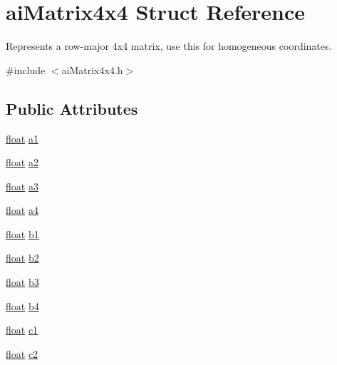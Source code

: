 \hypertarget{structai_matrix4x4}{\section{ai\-Matrix4x4 Struct Reference}
\label{structai_matrix4x4}
}


Represents a row-\/major 4x4 matrix, use this for homogeneous coordinates.  




{\ttfamily \#include $<$ai\-Matrix4x4.\-h$>$}

\subsection*{Public Attributes}
\begin{DoxyCompactItemize}
\item 
\hyperlink{fmod_8h_aeb841aa4b4b5f444b5d739d865b420af}{float} \hyperlink{structai_matrix4x4_aeabb269b7ef332d3c69c14d8af3d531c}{a1}
\item 
\hyperlink{fmod_8h_aeb841aa4b4b5f444b5d739d865b420af}{float} \hyperlink{structai_matrix4x4_a9d36d992ba3cfc814913e0225a04b91b}{a2}
\item 
\hyperlink{fmod_8h_aeb841aa4b4b5f444b5d739d865b420af}{float} \hyperlink{structai_matrix4x4_a36f0d69cf678c3b5deea5a76f5624848}{a3}
\item 
\hyperlink{fmod_8h_aeb841aa4b4b5f444b5d739d865b420af}{float} \hyperlink{structai_matrix4x4_a184e1a78f61c430aa7b0079b42e4c2a0}{a4}
\item 
\hyperlink{fmod_8h_aeb841aa4b4b5f444b5d739d865b420af}{float} \hyperlink{structai_matrix4x4_a59667637f4d71bf4ebc1183bebe746fb}{b1}
\item 
\hyperlink{fmod_8h_aeb841aa4b4b5f444b5d739d865b420af}{float} \hyperlink{structai_matrix4x4_af5dcecf706021b313239b7113cb80daa}{b2}
\item 
\hyperlink{fmod_8h_aeb841aa4b4b5f444b5d739d865b420af}{float} \hyperlink{structai_matrix4x4_a0f0bf4dfcf9dd562d71d5ed5a5342316}{b3}
\item 
\hyperlink{fmod_8h_aeb841aa4b4b5f444b5d739d865b420af}{float} \hyperlink{structai_matrix4x4_ae57a4a8b8f4509f5bdf90d7856c59281}{b4}
\item 
\hyperlink{fmod_8h_aeb841aa4b4b5f444b5d739d865b420af}{float} \hyperlink{structai_matrix4x4_a63c847f6e86653143aa659f13c154e2b}{c1}
\item 
\hyperlink{fmod_8h_aeb841aa4b4b5f444b5d739d865b420af}{float} \hyperlink{structai_matrix4x4_a67425f81054b1097c29b73bf317cfeeb}{c2}

\end{DoxyCompactItemize}
